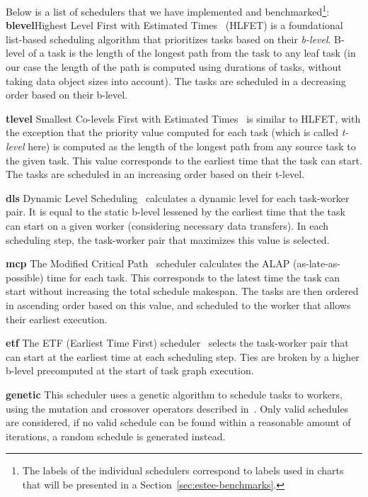 Below is a list of schedulers that we have implemented and benchmarked\footnote{The labels of the individual schedulers correspond to labels used in charts that will be presented
in a Section~\ref{sec:estee-benchmarks}.}:
\noindent\textbf{blevel}\quad Highest Level First with Estimated
Times~\cite{hlfet1974} (HLFET) is a foundational list-based scheduling algorithm that prioritizes
tasks based on their \emph{b-level}. B-level of a task is the length of the longest path
from the task to any leaf task (in our case the length of the path is computed using durations of
tasks, without taking data object sizes into account). The tasks are scheduled in a decreasing
order based on their b-level.

\noindent\textbf{tlevel}\quad
Smallest Co-levels First with Estimated Times~\cite{kwok1999static} is similar to HLFET, with the
exception that the priority value computed for each task (which is called \emph{t-level}
here) is computed as the length of the longest path from any source task to the given task. This
value corresponds to the earliest time that the task can start. The tasks are scheduled in an
increasing order based on their t-level.

\noindent\textbf{dls}\quad
Dynamic Level Scheduling~\cite{sih1993compile} calculates a dynamic level for each task-worker
pair. It is equal to the static b-level lessened by the earliest time that the task can start on a
given worker (considering necessary data transfers). In each scheduling step, the task-worker pair
that maximizes this value is selected.

\noindent\textbf{mcp}\quad
The Modified Critical Path~\cite{wu1990hypertool} scheduler calculates the ALAP
(as-late-as-possible) time for each task. This corresponds to the latest time the task can start
without increasing the total schedule makespan. The tasks are then ordered in ascending order based
on this value, and scheduled to the worker that allows their earliest execution.

\noindent\textbf{etf}\quad
The ETF (Earliest Time First) scheduler~\cite{hwang1989scheduling} selects the task-worker pair that
can start at the earliest time at each scheduling step. Ties are broken by a higher b-level
precomputed at the start of task graph execution.

\noindent\textbf{genetic}\quad
This scheduler uses a genetic algorithm to schedule tasks to workers, using the mutation and
crossover operators described in~\cite{omara2009genetic}. Only valid schedules are considered, if no
valid schedule can be found within a reasonable amount of iterations, a random schedule is
generated instead.

